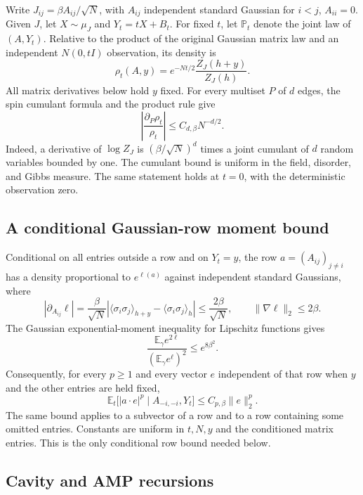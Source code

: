 \documentclass[11pt,reqno]{amsart}
\begin{document}
Write $J_{ij}=\beta A_{ij}/\sqrt N$, with $A_{ij}$ independent standard
Gaussian for $i<j$, $A_{ii}=0$.  Given $J$, let $X\sim\mu_J$ and
$Y_t=tX+B_t$.  For fixed $t$, let $\mathbb P_t$ denote the joint law of
$(A,Y_t)$.  Relative to the product of the original Gaussian matrix law and
an independent $N(0,tI)$ observation, its density is
\[
 \rho_t(A,y)=e^{-Nt/2}\frac{Z_J(h+y)}{Z_J(h)}.
\]
All matrix derivatives below hold $y$ fixed.  For every multiset $P$ of
$d$ edges, the spin cumulant formula and the product rule give
\begin{equation}\label{amp:density-derivatives}
 \left|\frac{\partial_P\rho_t}{\rho_t}\right|
 \le C_{d,\beta}N^{-d/2}.
\end{equation}
Indeed, a derivative of $\log Z_J$ is $(\beta/\sqrt N)^d$ times a joint
cumulant of $d$ random variables bounded by one.  The cumulant bound is
uniform in the field, disorder, and Gibbs measure.  The same statement
holds at $t=0$, with the deterministic observation zero.

\subsection{A conditional Gaussian-row moment bound}

Conditional on all entries outside a row and on $Y_t=y$, the row
$a=(A_{ij})_{j\ne i}$ has a density proportional to
$e^{\ell(a)}$ against independent standard Gaussians, where
\[
 \left|\partial_{A_{ij}}\ell\right|
 =\frac\beta{\sqrt N}
   \left|\langle\sigma_i\sigma_j\rangle_{h+y}
               -\langle\sigma_i\sigma_j\rangle_h\right|
 \le\frac{2\beta}{\sqrt N},\qquad
 \|\nabla\ell\|_2\le2\beta.
\]
The Gaussian exponential-moment inequality for Lipschitz functions gives
\[
 \frac{\mathbb E_\gamma e^{2\ell}}
      {(\mathbb E_\gamma e^\ell)^2}\le e^{8\beta^2}.
\]
Consequently, for every $p\ge1$ and every vector $e$ independent of that
row when $y$ and the other entries are held fixed,
\begin{equation}\label{amp:row-moment}
 \mathbb E_t\bigl[|a\cdot e|^p\mid A_{-i,-i},Y_t\bigr]
 \le C_{p,\beta}\|e\|_2^p.
\end{equation}
The same bound applies to a subvector of a row and to a row containing
some omitted entries.  Constants are uniform in $t,N,y$ and the conditioned
matrix entries.  This is the only conditional row bound needed below.

\subsection{Cavity and AMP recursions}
\end{document}
